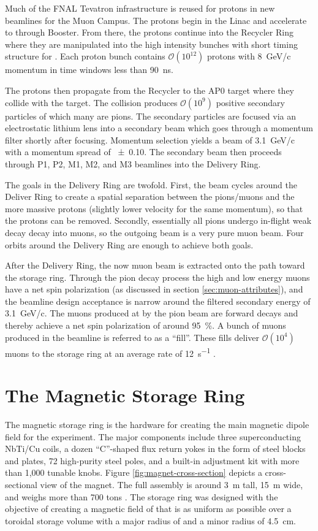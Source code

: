 Much of the FNAL Tevatron infrastructure is reused for protons in new beamlines for the Muon Campus.  The protons begin in the Linac and accelerate to through Booster.  From there, the protons continue into the Recycler Ring where they are manipulated into the high intensity bunches with short timing structure for \gmtwo.  Each proton bunch contains $\mathcal{O}(10^{12})$ protons with \SI{8}{\GeV/c} momentum in time windows less than \SI{90}{\nano \second}.

The protons then propagate from the Recycler to the AP0 target where they collide with the target.  The collision produces $\mathcal{O}(10^9)$ positive secondary particles of which many are pions.  The secondary particles are focused via an electrostatic lithium lens into a secondary beam which goes through a momentum filter shortly after focusing.  Momentum selection yields a beam of \SI{3.1}{\GeV/c} with a momentum spread of \SI{\pm 0.10}{}.  The secondary beam then proceeds through P1, P2, M1, M2, and M3 beamlines into the Delivery Ring.  

The goals in the Delivery Ring are twofold.  First, the beam cycles around the Deliver Ring to create a spatial separation between the pions/muons and the more massive protons (slightly lower velocity for the same momentum), so that the protons can be removed.  Secondly, essentially all pions undergo in-flight weak decay decay into muons, so the outgoing beam is a very pure muon beam.  Four orbits around the Delivery Ring are enough to achieve both goals.

After the Delivery Ring, the now muon beam is extracted onto the path toward the \mugmtwo storage ring. Through the pion decay process the high and low energy muons have a net spin polarization (as discussed in section \ref{sec:muon-attributes}), and the beamline design acceptance is narrow around the filtered secondary energy of \SI{3.1}{\GeV/c}.  The muons produced at \pmagic by the pion beam are forward decays and thereby achieve a net spin polarization of around \SI{95}{\percent}.  A bunch of muons produced in the beamline is referred to as a ``fill''. These fills deliver $\mathcal{O}(10^{4})$ muons to the storage ring at an average rate of \SI{12}{\second^{-1}} \cite{e989-tdr}.

\section{The Magnetic Storage Ring} \label{sec:storage-ring}
The magnetic storage ring is the hardware for creating the main magnetic dipole field for the experiment.  The major components include three superconducting NbTi/Cu coils, a dozen ``C''-shaped flux return yokes in the form of steel blocks and plates, 72 high-purity steel poles, and a built-in adjustment kit with more than 1,000 tunable knobs.  Figure \ref{fig:magnet-cross-section} depicts a cross-sectional view of the magnet.  The full assembly is around \SI{3}{\meter} tall, \SI{15}{\meter} wide, and weighs more than 700 tons \cite{e989-tdr}.  The storage ring was designed with the objective of creating a magnetic field of \bmagic that is as uniform as possible over a toroidal storage volume with a major radius of \rmagic and a minor radius of \SI{4.5}{\cm}.

